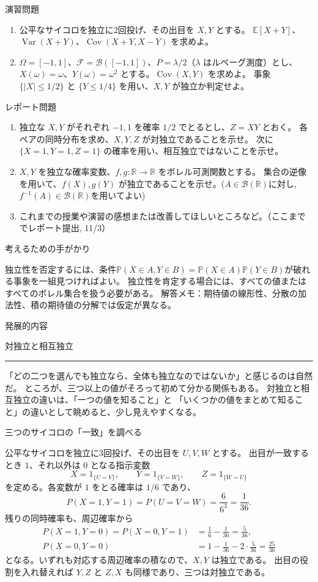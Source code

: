 \documentclass[a4paper,10pt,pdflatex,ja=standard,jafont=ipaex-type1,
  magstyle=real,scale=1]{bxjsarticle}
\newcommand{\coursename}{確率論と統計学 I}
\newcommand{\topic}[1]{\par\vspace{5pt}
  {\large\sffamily\mdseries\color{accent}#1}\par\vspace{2pt}}
\newcommand{\columnheading}[1]{\par\vspace{5pt}
  {\fontsize{11pt}{15pt}\selectfont\sffamily\mdseries\color{accent}#1}\par\vspace{2pt}}
\newcommand{\columnstart}[1]{\clearpage\begingroup
  \setlength{\parskip}{2.5pt}
  \fancyhead[L]{\small\color{ink}\coursename{}・発展的内容}
  {\small\sffamily\mdseries\color{accent}発展的内容}\par\vspace{4pt}
  {\Large\color{ink}#1}\par\vspace{2pt}
  {\color{accent}\rule{\linewidth}{0.7pt}}\par\vspace{4pt}}
\newcommand{\F}{\mathcal F}
\newcommand{\R}{\mathbb R}
\newcommand{\E}{\mathbb E}
\newcommand{\Var}{\operatorname{Var}}
\newcommand{\Cov}{\operatorname{Cov}}
\newcommand{\ind}{\mathrm{1}}
\begin{document}
\newpage
\topic{演習問題}
\begin{enumerate}[label=\arabic*.]
  \item 公平なサイコロを独立に2回投げ、その出目を $X,Y$ とする。
  $\E[X+Y]$、$\Var(X+Y)$、$\Cov(X+Y,X-Y)$ を求めよ。
  \item $\Omega=[-1,1]$、$\F=\mathcal B([-1,1])$、$P=\lambda/2$（$\lambda$ はルベーグ測度）とし、
  $X(\omega)=\omega$、$Y(\omega)=\omega^2$ とする。$\Cov(X,Y)$ を求めよ。
  事象 $\{|X|\le1/2\}$ と $\{Y\le1/4\}$ を用い、$X,Y$ が独立か判定せよ。
\end{enumerate}

\topic{レポート問題}
\begin{enumerate}[label=\arabic*.]
  \item 独立な $X,Y$ がそれぞれ $-1,1$ を確率 $1/2$ でとるとし、$Z=XY$ とおく。
  各ペアの同時分布を求め、$X,Y,Z$ が対独立であることを示せ。
  次に $\{X=1,Y=1,Z=1\}$ の確率を用い、相互独立ではないことを示せ。
  \item $X,Y$ を独立な確率変数、$f,g:\R\to\R$ をボレル可測関数とする。
  集合の逆像を用いて、$f(X),g(Y)$ が独立であることを示せ。($A\in \mathcal B(\mathbb R)$に対し, $f^{-1}(A)\in \mathcal B(\mathbb R)$を用いてよい)
  \item これまでの授業や演習の感想または改善してほしいところなど。（ここまででレポート提出, 11/3）
\end{enumerate}

\topic{考えるための手がかり}
独立性を否定するには、条件$\mathbb P(X\in A,Y\in B) =\mathbb P(X\in A)\mathbb P(Y\in B)  $が破れる事象を一組見つければよい。
独立性を肯定する場合には、すべての値またはすべてのボレル集合を扱う必要がある。
\vfill
{\small\color{muted}解答メモ：期待値の線形性、分散の加法性、積の期待値の分解では仮定が異なる。}

\columnstart{対独立と相互独立}
「どの二つを選んでも独立なら、全体も独立なのではないか」と感じるのは自然だ。
ところが、三つ以上の値がそろって初めて分かる関係もある。
対独立と相互独立の違いは、「一つの値を知ること」と
「いくつかの値をまとめて知ること」の違いとして眺めると、少し見えやすくなる。

\columnheading{三つのサイコロの「一致」を調べる}
公平なサイコロを独立に3回投げ、その出目を $U,V,W$ とする。
出目が一致するとき $1$、それ以外は $0$ となる指示変数
$$
  X=\ind_{\{U=V\}},\qquad Y=\ind_{\{V=W\}},\qquad Z=\ind_{\{W=U\}}
$$
を定める。各変数が $1$ をとる確率は $1/6$ であり、
$$
  P(X=1,Y=1)=P(U=V=W)=\frac{6}{6^3}=\frac1{36}.
$$
残りの同時確率も、周辺確率から
$$
  \begin{aligned}
    P(X=1,Y=0)=P(X=0,Y=1)&=\frac16-\frac1{36}=\frac5{36},\\
    P(X=0,Y=0)&=1-\frac1{36}-2\cdot\frac5{36}=\frac{25}{36}
  \end{aligned}
$$
となる。いずれも対応する周辺確率の積なので、$X,Y$ は独立である。
出目の役割を入れ替えれば $Y,Z$ と $Z,X$ も同様であり、三つは対独立である。
\end{document}
